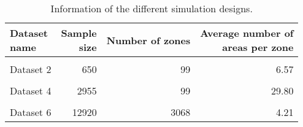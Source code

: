 \begin{table}

\caption{\label{tab:dataset_info}Information of the different simulation designs.}
\centering
\begin{tabular}[t]{lrrr}
\toprule
\makecell[l]{Dataset \\ name} & \makecell[c]{Sample \\ size} & Number of zones & \makecell[l]{Average number of \\ areas per zone}\\
\midrule
\cellcolor{gray!6}{Dataset 1} & \cellcolor{gray!6}{390} & \cellcolor{gray!6}{12} & \cellcolor{gray!6}{32.50}\\
Dataset 2 & 650 & 99 & 6.57\\
\cellcolor{gray!6}{Dataset 3} & \cellcolor{gray!6}{2955} & \cellcolor{gray!6}{6} & \cellcolor{gray!6}{492.00}\\
Dataset 4 & 2955 & 99 & 29.80\\
\cellcolor{gray!6}{Dataset 5} & \cellcolor{gray!6}{2955} & \cellcolor{gray!6}{650} & \cellcolor{gray!6}{4.55}\\
Dataset 6 & 12920 & 3068 & 4.21\\
\bottomrule
\end{tabular}
\end{table}
